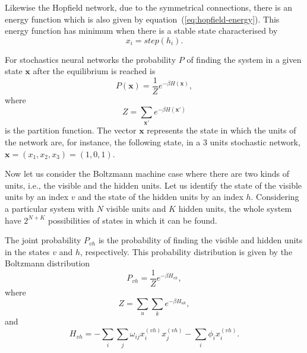 Likewise the Hopfield network, due to the symmetrical connections, there is an energy function which is also given by equation~(\ref{eq:hopfield-energy}). This energy function has minimum when there is a stable state characterised by
\begin{equation}
  \label{eq:stochastic-stable-state}
  x_{i} = step(h_{i}).
\end{equation}

For stochastics neural networks the probability $P$ of finding the system in a given state $\mathbf{x}$ after the equilibrium is reached is
\begin{equation}
  \label{eq:stochastic-prob}
  P(\mathbf{x}) = \frac{1}{Z} e^{-\beta H(\mathbf{x})},
\end{equation}
where
\begin{equation}
  \label{eq:stochastic-z}
  Z = \sum_{\mathbf{x}'} e^{-\beta H(\mathbf{x}')}
\end{equation}
is the partition function. The vector $\mathrm{\mathbf{x}}$ represents the state in which the units of the network are, for instance, the following state, in a 3 units stochastic network, $\mathrm{\mathbf{x}} = (x_{1}, x_{2}, x_{3}) = (1, 0, 1)$.

Now let us consider the Boltzmann machine case where there are two kinds of units, i.e., the visible and the hidden units. 
Let us identify the state of the visible units by an index $v$ and the state of the hidden units by an index $h$. 
Considering a particular system with $N$ visible units and $K$ hidden units, the whole system have $2^{N + K}$ possibilities of states in which it can be found.

The joint probability $P_{vh}$ is the probability of finding the visible and hidden units in the states $v$ and $h$, respectively.
This probability distribution is given by the Boltzmann distribution
\begin{equation}
  \label{eq:bm-joint-prob}
  P_{vh} = \frac{1}{Z}e^{-\beta H_{vh}},
\end{equation}
where
\begin{equation}
  \label{eq:bm-z}
  Z = \sum_{u} \sum_{k} e^{-\beta H_{uk}},
\end{equation}
and
\begin{equation}
  \label{eq:bm-energy-function}
  H_{vh} = - \sum_{i} \sum_{j} \omega_{ij} x^{(vh)}_{i} x^{(vh)}_{j} - \sum_{i} \phi_{i} x^{(vh)}_{i}.
\end{equation}

